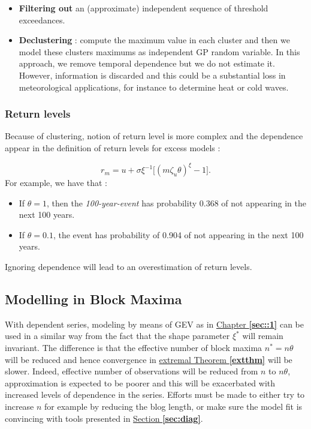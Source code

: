 \begin{itemize}
	\item \textbf{Filtering out} an (approximate) independent sequence of threshold exceedances.
	\item \textbf{Declustering} : compute the maximum value in each cluster and then we model these clusters maximums as independent GP random variable. In this approach, we remove temporal dependence but we do not estimate it.
	However, information is discarded and this could be a substantial loss in meteorological applications, for instance to determine heat or cold waves.
\end{itemize}



\subsubsection*{Return levels}

Because of clustering, notion of return level is more complex and the dependence appear in the definition of return levels for excess models :

\begin{equation}
r_m = u + \sigma\xi^{-1}\Big[(m\zeta_u\theta)^{\xi}-1\Big].
\end{equation}
For example, we have that :

\begin{itemize}
	\item If $\theta=1$, then the \textit{100-year-event} has probability 0.368 of not appearing in the next 100 years.
	\item If $\theta=0.1$, the event has probability of 0.904 of not appearing in the next 100 years.
\end{itemize}
Ignoring dependence will lead to an overestimation of return levels.


\subsection{Modelling in Block Maxima}

With dependent series, modeling by means of GEV as in 
\hyperref[sec::1]{Chapter \textbf{\ref{sec::1}}} can be used in 
a similar way from the fact that the shape parameter $\xi^*$ will remain invariant. The difference is that the effective number of block maxima $n^*=n\theta$ will be reduced and hence convergence in \hyperref[extthm]{extremal Theorem \textbf{\ref{extthm}}} will be slower. 
Indeed, effective number of observations will be reduced from $n$ to $n\theta$, approximation is expected to be poorer and this will be exacerbated with increased levels of dependence in the series.
Efforts must be made to either try to increase $n$ for example by reducing the blog length, or make sure the model fit is convincing with tools presented in \hyperref[sec:diag]{Section \textbf{\ref{sec:diag}}}.


